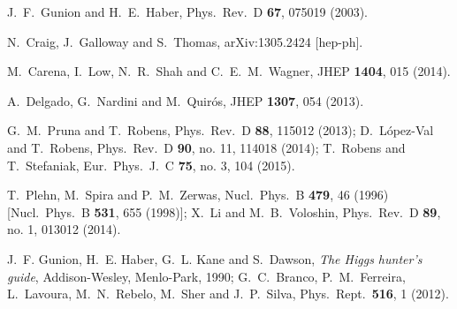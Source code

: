   J.~F.~Gunion and H.~E.~Haber,
  Phys.\ Rev.\ D {\bf 67}, 075019 (2003).

  N.~Craig, J.~Galloway and S.~Thomas,
  arXiv:1305.2424 [hep-ph].
  
  M.~Carena, I.~Low, N.~R.~Shah and C.~E.~M.~Wagner,
  JHEP {\bf 1404}, 015 (2014).

  A.~Delgado, G.~Nardini and M.~Quir\'os,
  JHEP {\bf 1307}, 054 (2013).
  
  G.~M.~Pruna and T.~Robens,
  Phys.\ Rev.\ D {\bf 88}, 115012 (2013);
  D.~L\'opez-Val and T.~Robens,
  Phys.\ Rev.\ D {\bf 90}, no. 11, 114018 (2014);  
  T.~Robens and T.~Stefaniak,
  Eur.\ Phys.\ J.\ C {\bf 75}, no. 3, 104 (2015).

  T.~Plehn, M.~Spira and P.~M.~Zerwas,
  Nucl.\ Phys.\ B {\bf 479}, 46 (1996)
  [Nucl.\ Phys.\ B {\bf 531}, 655 (1998)];
  X.~Li and M.~B.~Voloshin,
  Phys.\ Rev.\ D {\bf 89}, no. 1, 013012 (2014).

  J.~F. Gunion, H.~E. Haber, G.~L. Kane and S.~Dawson,
  \textsl{The {H}iggs hunter's guide},
  Addison-Wesley, Menlo-Park, 1990;
  G.~C.~Branco, P.~M.~Ferreira, L.~Lavoura, M.~N.~Rebelo, M.~Sher and J.~P.~Silva,
  Phys.\ Rept.\  {\bf 516}, 1 (2012).


